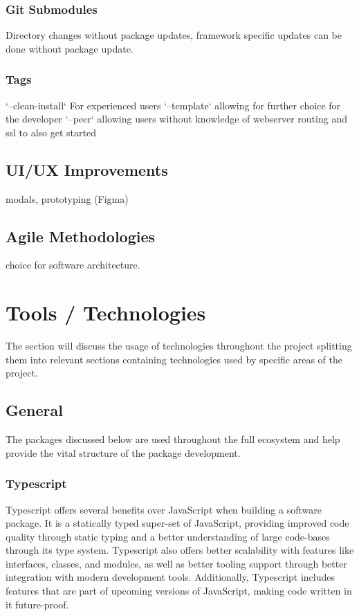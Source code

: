 \documentclass{l4proj}
\begin{document}
\subsection{Git Submodules}
\text Directory changes without package updates, framework specific updates can be done without package update.
\subsection{Tags}
\text `--clean-install` For experienced users `--template` allowing for further choice for the developer `--peer` allowing users without knowledge of webserver routing and ssl to also get started
\section{UI/UX Improvements}
\text modals, prototyping (Figma)
\section{Agile Methodologies}
\text choice for software architecture.
\chapter{Tools / Technologies}

The section will discuss the usage of technologies throughout the project splitting them into relevant sections containing technologies used by specific areas of the project.

\section{General}

The packages discussed below are used throughout the full ecosystem and help provide the vital structure of the package development.

\subsection{Typescript}
\text Typescript offers several benefits over JavaScript when building a software package. It is a statically typed super-set of JavaScript, providing improved code quality through static typing and a better understanding of large code-bases through its type system. Typescript also offers better scalability with features like interfaces, classes, and modules, as well as better tooling support through better integration with modern development tools. Additionally, Typescript includes features that are part of upcoming versions of JavaScript, making code written in it future-proof.
\end{document}
